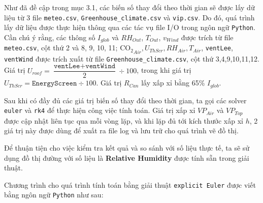 \documentclass[a4paper]{article}
\begin{document}
Như đã đề cập trong mục 3.1, các biến số thay đổi theo thời gian sẽ được lấy dữ liệu từ 3 file \texttt{meteo.csv}, \texttt{Greenhouse\_climate.csv} và \texttt{vip.csv}. Do đó, quá trình lấy dữ liệu được thực hiện thông qua các tác vụ file I/O trong ngôn ngữ \texttt{Python}. Cần chú ý rằng, các thông số $I_{glob}$ và $RH_{Out}$, $T_{Out}$, $v_{Wind}$ được trích từ file \texttt{meteo.csv}, cột thứ 2 và 8, 9, 10, 11; $\mathrm{CO_{2}}_{Air}, U_{ThScr}, RH_{Air}, T_{Air}$, \texttt{ventLee}, \texttt{ventWind} được trích xuất từ file \texttt{Greenhouse\_climate.csv}, cột thứ 3,4,9,10,11,12. Giá trị $U_{roof} = \dfrac{\texttt{ventLee} + \texttt{ventWind}}{2} \div 100$, trong khi giá trị $U_{ThScr} = \texttt{EnergyScreen} \div 100$. Giá trị $R_{Can}$ lấy xấp xỉ bằng 65\% $I_{glob}$.

Sau khi có đầy đủ các giá trị biến số thay đổi theo thời gian, ta gọi các solver \texttt{euler} và \texttt{rk4} để thực hiện công việc tính toán. Giá trị xấp xỉ $VP_{Air}$ và $VP_{Top}$ được cập nhật liên tục qua mỗi vòng lặp, và khi lặp đủ tới kích thước xấp xỉ $h$, 2 giá trị này được dùng để xuất ra file log và lưu trữ cho quá trình vẽ đồ thị. \par

Để thuận tiện cho việc kiểm tra kết quả và so sánh với số liệu thực tế, ta sẽ sử dụng đồ thị đường với số liệu là \textbf{Relative Humidity} được tính sẵn trong giải thuật.

Chương trình cho quá trình tính toán bằng giải thuật \texttt{explicit Euler} được viết bằng ngôn ngữ \texttt{Python} như sau:
\end{document}
